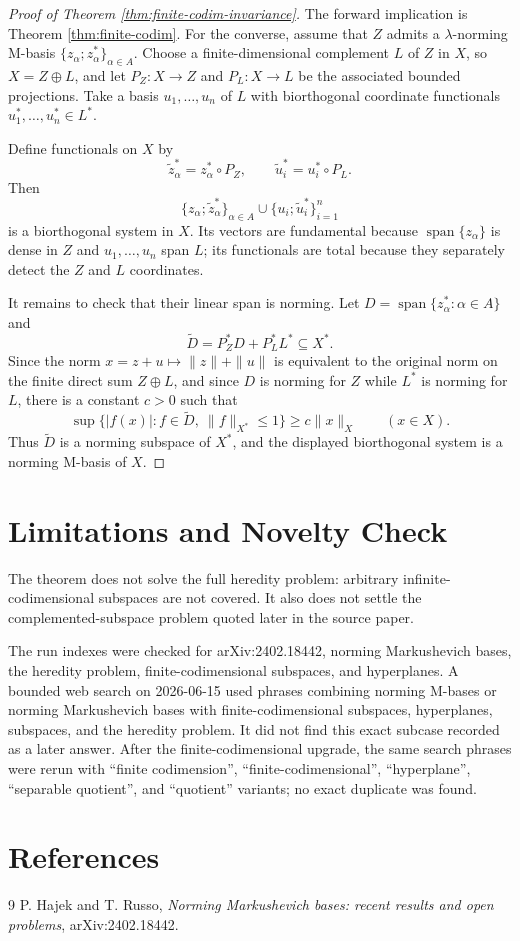 \documentclass[11pt]{article}
\newcommand{\X}{X}
\newcommand{\Z}{Z}
\newcommand{\spn}{\operatorname{span}}
\begin{document}
\begin{proof}[Proof of Theorem \ref{thm:finite-codim-invariance}]
The forward implication is Theorem \ref{thm:finite-codim}. For the converse,
assume that $\Z$ admits a $\lambda$-norming M-basis
$\{z_\alpha;z_\alpha^*\}_{\alpha\in A}$. Choose a finite-dimensional
complement $L$ of $\Z$ in $\X$, so $\X=\Z\oplus L$, and let
$P_\Z:\X\to\Z$ and $P_L:\X\to L$ be the associated bounded projections.
Take a basis $u_1,\ldots,u_n$ of $L$ with biorthogonal coordinate
functionals $u_1^*,\ldots,u_n^*\in L^*$.

Define functionals on $\X$ by
\[
    \widetilde z_\alpha^* = z_\alpha^*\circ P_\Z,\qquad
    \widetilde u_i^* = u_i^*\circ P_L .
\]
Then
\[
    \{z_\alpha;\widetilde z_\alpha^*\}_{\alpha\in A}
    \cup
    \{u_i;\widetilde u_i^*\}_{i=1}^n
\]
is a biorthogonal system in $\X$. Its vectors are fundamental because
$\spn\{z_\alpha\}$ is dense in $\Z$ and $u_1,\ldots,u_n$ span $L$; its
functionals are total because they separately detect the $\Z$ and $L$
coordinates.

It remains to check that their linear span is norming. Let
$D=\spn\{z_\alpha^*:\alpha\in A\}$ and
\[
    \widetilde D=P_\Z^*D+P_L^*L^*
    \subseteq \X^* .
\]
Since the norm $x=z+u\mapsto \|z\|+\|u\|$ is equivalent to the original norm
on the finite direct sum $\Z\oplus L$, and since $D$ is norming for $\Z$
while $L^*$ is norming for $L$, there is a constant $c>0$ such that
\[
    \sup\{ |f(x)|: f\in \widetilde D,\ \|f\|_{\X^*}\le 1\}
    \ge c\|x\|_\X
    \qquad (x\in \X).
\]
Thus $\widetilde D$ is a norming subspace of $\X^*$, and the displayed
biorthogonal system is a norming M-basis of $\X$.
\end{proof}

\section*{Limitations and Novelty Check}

The theorem does not solve the full heredity problem: arbitrary
infinite-codimensional subspaces are not covered. It also does not settle the
complemented-subspace problem quoted later in the source paper.

The run indexes were checked for arXiv:2402.18442, norming Markushevich bases,
the heredity problem, finite-codimensional subspaces, and hyperplanes. A
bounded web search on 2026-06-15 used phrases combining norming M-bases or
norming Markushevich bases with finite-codimensional subspaces, hyperplanes,
subspaces, and the heredity problem. It did not find this exact subcase
recorded as a later answer. After the finite-codimensional upgrade, the same
search phrases were rerun with ``finite codimension'', ``finite-codimensional'',
``hyperplane'', ``separable quotient'', and ``quotient'' variants; no exact
duplicate was found.

\section*{References}

\begin{thebibliography}{9}
P. Hajek and T. Russo,
\emph{Norming Markushevich bases: recent results and open problems},
arXiv:2402.18442.
\end{thebibliography}
\end{document}
